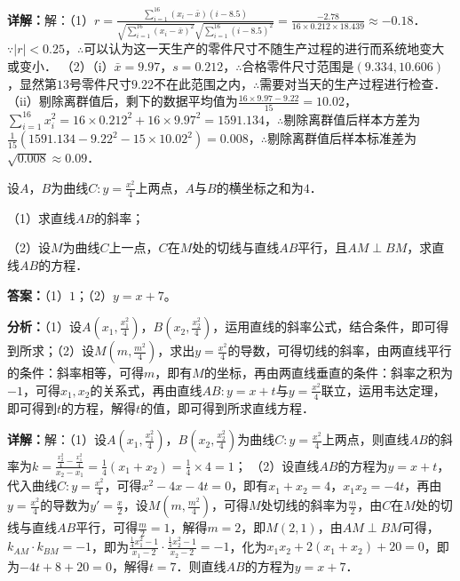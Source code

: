 \begin{question}[points=12]
\begin{solution}
\textbf{详解：}解：（1）$r=\frac{\sum_{i=1}^{16}(x_i-\bar{x})(i-8.5)}{\sqrt{\sum_{i=1}^{16}(x_i-\bar{x})^2}\sqrt{\sum_{i=1}^{16}(i-8.5)^2}}=\frac{-2.78}{16\times0.212\times18.439}\approx-0.18$．$\because|r|<0.25$，$\therefore$可以认为这一天生产的零件尺寸不随生产过程的进行而系统地变大或变小．
（2）（i）$\bar{x}=9.97$，$s=0.212$，$\therefore$合格零件尺寸范围是$(9.334,10.606)$，显然第$13$号零件尺寸$9.22$不在此范围之内，$\therefore$需要对当天的生产过程进行检查．
（ii）剔除离群值后，剩下的数据平均值为$\frac{16\times9.97-9.22}{15}=10.02$，$\sum_{i=1}^{16}x_i^2=16\times0.212^2+16\times9.97^2=1591.134$，$\therefore$剔除离群值后样本方差为$\frac{1}{15}(1591.134-9.22^2-15\times10.02^2)=0.008$，$\therefore$剔除离群值后样本标准差为$\sqrt{0.008}\approx0.09$．
\end{solution}
\end{question}

\begin{question}[points=12]
设$A$，$B$为曲线$C:y=\frac{x^2}{4}$上两点，$A$与$B$的横坐标之和为$4$．

（1）求直线$AB$的斜率；

（2）设$M$为曲线$C$上一点，$C$在$M$处的切线与直线$AB$平行，且$AM\perp BM$，求直线$AB$的方程．
\begin{solution}
\textbf{答案：}（1）$1$；（2）$y=x+7$。

\textbf{分析：}（1）设$A(x_1,\frac{x_1^2}{4})$，$B(x_2,\frac{x_2^2}{4})$，运用直线的斜率公式，结合条件，即可得到所求；（2）设$M(m,\frac{m^2}{4})$，求出$y=\frac{x^2}{4}$的导数，可得切线的斜率，由两直线平行的条件：斜率相等，可得$m$，即有$M$的坐标，再由两直线垂直的条件：斜率之积为$-1$，可得$x_1,x_2$的关系式，再由直线$AB:y=x+t$与$y=\frac{x^2}{4}$联立，运用韦达定理，即可得到$t$的方程，解得$t$的值，即可得到所求直线方程．

\textbf{详解：}解：（1）设$A(x_1,\frac{x_1^2}{4})$，$B(x_2,\frac{x_2^2}{4})$为曲线$C:y=\frac{x^2}{4}$上两点，则直线$AB$的斜率为$k=\frac{\frac{x_2^2}{4}-\frac{x_1^2}{4}}{x_2-x_1}=\frac{1}{4}(x_1+x_2)=\frac{1}{4}\times4=1$；
（2）设直线$AB$的方程为$y=x+t$，代入曲线$C:y=\frac{x^2}{4}$，可得$x^2-4x-4t=0$，即有$x_1+x_2=4$，$x_1x_2=-4t$，再由$y=\frac{x^2}{4}$的导数为$y'=\frac{x}{2}$，设$M(m,\frac{m^2}{4})$，可得$M$处切线的斜率为$\frac{m}{2}$，由$C$在$M$处的切线与直线$AB$平行，可得$\frac{m}{2}=1$，解得$m=2$，即$M(2,1)$，由$AM\perp BM$可得，$k_{AM}\cdot k_{BM}=-1$，即为$\frac{\frac{1}{4}x_1^2-1}{x_1-2}\cdot\frac{\frac{1}{4}x_2^2-1}{x_2-2}=-1$，化为$x_1x_2+2(x_1+x_2)+20=0$，即为$-4t+8+20=0$，解得$t=7$．则直线$AB$的方程为$y=x+7$．
\end{solution}
\end{question}

